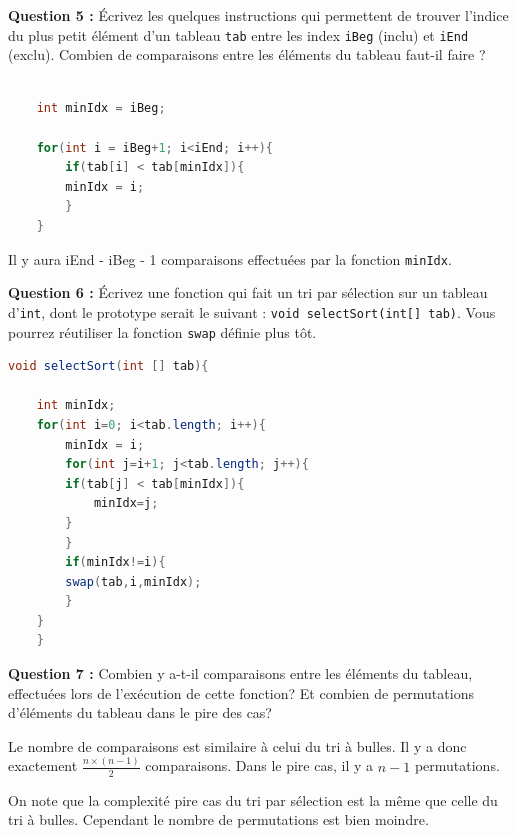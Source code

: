 \documentclass[iutinfo,a4paper,nocorrections,10pt]{ustl-tdtp}
\begin{document}
\textbf{Question 5 :} Écrivez les quelques instructions qui permettent de trouver l'indice du plus petit élément d'un tableau \texttt{tab} entre les index \texttt{iBeg} (inclu) et \texttt{iEnd} (exclu). Combien de comparaisons entre les éléments du tableau faut-il faire ?\newline


\begin{correction}
{\color{red}

\begin{lstlisting}[language=java]

	int minIdx = iBeg;

	for(int i = iBeg+1; i<iEnd; i++){
	    if(tab[i] < tab[minIdx]){
		minIdx = i;
	    }
	}


\end{lstlisting}

Il y aura iEnd - iBeg - 1  comparaisons effectuées par la fonction \texttt{minIdx}.
}
\end{correction}


\textbf{Question 6 :} Écrivez une fonction qui fait un tri par sélection sur un tableau d'\texttt{int}, dont le prototype serait le suivant : \texttt{void selectSort(int[] tab)}. Vous pourrez réutiliser la fonction \texttt{swap} définie plus tôt.\newline

\begin{correction}
{\color{red}

\begin{lstlisting}[language=java]
    void selectSort(int [] tab){
	
	int minIdx;
	for(int i=0; i<tab.length; i++){
	    minIdx = i;
	    for(int j=i+1; j<tab.length; j++){
		if(tab[j] < tab[minIdx]){
		    minIdx=j;
		}
	    }
	    if(minIdx!=i){
		swap(tab,i,minIdx);
	    }
	}
    }

\end{lstlisting}
}
\end{correction}

 
\textbf{Question 7 :} Combien y a-t-il comparaisons entre les éléments du tableau, effectuées lors de l'exécution de cette fonction? Et combien de permutations d'éléments du tableau dans le pire des cas?

\begin{correction}

{\color{red}
Le nombre de comparaisons est similaire à celui du tri à bulles. Il y a donc exactement $\frac{n \times (n-1)}{2}$ comparaisons. Dans le pire cas, il y a $n-1$ permutations.

On note que la complexité pire cas du tri par sélection est la même que celle du tri à bulles. Cependant le nombre de permutations est bien moindre.

}

\end{correction}
\end{document}
